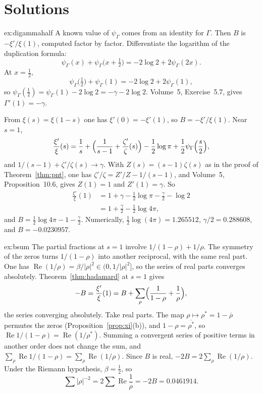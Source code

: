 \section{Solutions}

\begin{solution}{ex:digammahalf}
\idea A known value of $\psi_\Gamma$ comes from an identity for $\Gamma$. Then $B$ is $-\xi'/\xi(1)$, computed factor by factor.
\writeup Differentiate the logarithm of the duplication formula:
\[
\psi_\Gamma(x)+\psi_\Gamma\bigl(x+\tfrac12\bigr)=-2\log2+2\psi_\Gamma(2x).
\]
At $x=\frac12$,
\[
\psi_\Gamma\bigl(\tfrac12\bigr)+\psi_\Gamma(1)=-2\log2+2\psi_\Gamma(1),
\]
so $\psi_\Gamma(\frac12)=\psi_\Gamma(1)-2\log2=-\gamma-2\log2$. Volume~5, Exercise~5.7, gives $\Gamma'(1)=-\gamma$.

From $\xi(s)=\xi(1-s)$ one has $\xi'(0)=-\xi'(1)$, so $B=-\xi'/\xi(1)$. Near $s=1$,
\[
\frac{\xi'}{\xi}(s)=\frac1s+\Bigl(\frac1{s-1}+\frac{\zeta'}{\zeta}(s)\Bigr)-\frac12\log\pi+\frac12\psi_\Gamma\Bigl(\frac s2\Bigr),
\]
and $1/(s-1)+\zeta'/\zeta(s)\to\gamma$. With $Z(s)=(s-1)\zeta(s)$ as in the proof of Theorem~\ref{thm:pnt}, one has $\zeta'/\zeta=Z'/Z-1/(s-1)$, and Volume~5, Proposition~10.6, gives $Z(1)=1$ and $Z'(1)=\gamma$. So
\[
\begin{aligned}\frac{\xi'}{\xi}(1)&=1+\gamma-\frac12\log\pi-\frac\gamma2-\log2\\&=1+\frac\gamma2-\frac12\log4\pi,\end{aligned}
\]
and $B=\frac12\log4\pi-1-\frac\gamma2$. Numerically, $\frac12\log(4\pi)=1.265512$, $\gamma/2=0.288608$, and $B=-0.0230957$.
\end{solution}

\begin{solution}{ex:bsum}
\idea The partial fractions at $s=1$ involve $1/(1-\rho)+1/\rho$. The symmetry of the zeros turns $1/(1-\rho)$ into another reciprocal, with the same real part.
\writeup One has $\operatorname{Re}(1/\rho)=\beta/|\rho|^2\in\bigl(0,1/|\rho|^2\bigr]$, so the series of real parts converges absolutely. Theorem~\ref{thm:hadamard} at $s=1$ gives
\[
-B=\frac{\xi'}{\xi}(1)=B+\sum_\rho\Bigl(\frac1{1-\rho}+\frac1\rho\Bigr),
\]
the series converging absolutely. Take real parts. The map $\rho\mapsto\rho^*=1-\overline\rho$ permutes the zeros (Proposition~\ref{prop:xi}(b)), and $1-\rho=\overline{\rho^*}$, so $\operatorname{Re}1/(1-\rho)=\operatorname{Re}(1/\rho^*)$. Summing a convergent series of positive terms in another order does not change the sum, and $\sum_\rho\operatorname{Re}1/(1-\rho)=\sum_\rho\operatorname{Re}(1/\rho)$. Since $B$ is real, $-2B=2\sum_\rho\operatorname{Re}(1/\rho)$. Under the Riemann hypothesis, $\beta=\frac12$, so
\[
\sum|\rho|^{-2}=2\sum\operatorname{Re}\frac1\rho=-2B=0.0461914.
\]
\end{solution}

